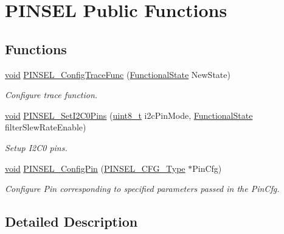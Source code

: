 \hypertarget{group___p_i_n_s_e_l___public___functions}{}\section{P\+I\+N\+S\+EL Public Functions}
\label{group___p_i_n_s_e_l___public___functions}
\subsection*{Functions}
\begin{DoxyCompactItemize}
\item 
\hyperlink{usb__devapi_8h_afabf60e7f57651d6d595a02c75f07cd0}{void} \hyperlink{group___p_i_n_s_e_l___public___functions_ga9a48ea7b433ed1a2cb149627cf5c7c6b}{P\+I\+N\+S\+E\+L\+\_\+\+Config\+Trace\+Func} (\hyperlink{agilefox_2library_2inc_2stm32f10x__type_8h_ac9a7e9a35d2513ec15c3b537aaa4fba1}{Functional\+State} New\+State)
\begin{DoxyCompactList}\small\item\em Configure trace function. \end{DoxyCompactList}\item 
\hyperlink{usb__devapi_8h_afabf60e7f57651d6d595a02c75f07cd0}{void} \hyperlink{group___p_i_n_s_e_l___public___functions_gacb6281f39ff79f79e9c29487f89a8b33}{P\+I\+N\+S\+E\+L\+\_\+\+Set\+I2\+C0\+Pins} (\hyperlink{_p_e___types_8h_aba7bc1797add20fe3efdf37ced1182c5}{uint8\+\_\+t} i2c\+Pin\+Mode, \hyperlink{agilefox_2library_2inc_2stm32f10x__type_8h_ac9a7e9a35d2513ec15c3b537aaa4fba1}{Functional\+State} filter\+Slew\+Rate\+Enable)
\begin{DoxyCompactList}\small\item\em Setup I2\+C0 pins. \end{DoxyCompactList}\item 
\hyperlink{usb__devapi_8h_afabf60e7f57651d6d595a02c75f07cd0}{void} \hyperlink{group___p_i_n_s_e_l___public___functions_ga771fcbed8f7ee806292e06e283611dc9}{P\+I\+N\+S\+E\+L\+\_\+\+Config\+Pin} (\hyperlink{struct_p_i_n_s_e_l___c_f_g___type}{P\+I\+N\+S\+E\+L\+\_\+\+C\+F\+G\+\_\+\+Type} $\ast$Pin\+Cfg)
\begin{DoxyCompactList}\small\item\em Configure Pin corresponding to specified parameters passed in the Pin\+Cfg. \end{DoxyCompactList}\end{DoxyCompactItemize}


\subsection{Detailed Description}


